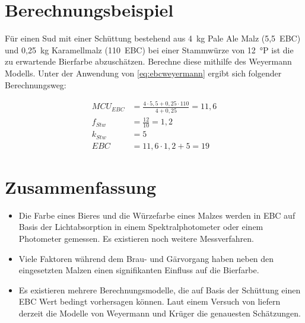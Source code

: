 \documentclass[a4paper,parskip=half]{scrartcl}
\newcommand{\MCUEBC}{\mathit{MCU}_{EBC}}
\newcommand{\EBC}{\mathit{EBC}}
\newcommand{\fstw}{f_{Stw}}
\newcommand{\kstw}{k_{Stw}}
\begin{document}
\section*{Berechnungsbeispiel}

Für einen Sud mit einer Schüttung bestehend aus 4~kg Pale Ale Malz (5,5~EBC) und 0,25~kg Kara­mell­mal­z (110~EBC) bei einer Stammwürze von 12~°P ist die zu erwartende Bierfarbe abzuschätzen. Berechne diese mithilfe des Weyermann Modells. Unter der Anwendung von \autoref{eq:ebcweyermann} ergibt sich folgender Berechnungsweg:

\begin{align*}
\MCUEBC &= \frac{4 \cdot 5,5 + 0,25 \cdot 110}{4 + 0,25} = 11,6 \\
\fstw &= \frac{12}{10} = 1,2 \\
\kstw &= 5 \\
\EBC &= 11,6 \cdot 1,2 + 5 = 19
\end{align*}

\section*{Zusammenfassung}

\begin{itemize}
\item Die Farbe eines Bieres und die Würzefarbe eines Malzes werden in EBC auf Basis der Lichtabsorption in einem Spektralphotometer oder einem Photometer gemessen. Es existieren noch weitere Messverfahren.
\item Viele Faktoren während dem Brau- und Gärvorgang haben neben den eingesetzten Malzen einen signifikanten Einfluss auf die Bierfarbe.
\item Es existieren mehrere Berechnungsmodelle, die auf Basis der Schüttung einen EBC Wert bedingt vorhersagen können. Laut einem Versuch von \citeauthor{KrausWeyermann2022} liefern derzeit die Modelle von Weyermann und Krüger die genauesten Schätzungen.
\end{itemize}

\printbibliography[title=Quellen]
\end{document}
